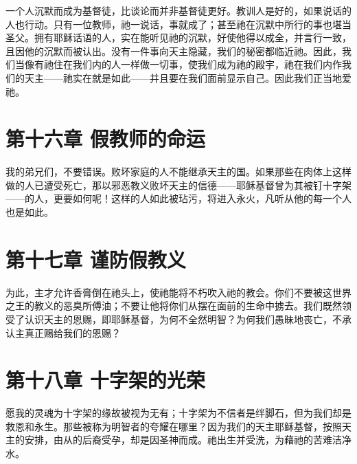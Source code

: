 一个人沉默而成为基督徒，比谈论而并非基督徒更好。教训人是好的，如果说话的人也行动。只有一位教师，祂一说话，事就成了；甚至祂在沉默中所行的事也堪当圣父。拥有耶稣话语的人，实在能听见祂的沉默，好使他得以成全，并言行一致，且因他的沉默而被认出。没有一件事向天主隐藏，我们的秘密都临近祂。因此，我们当像有祂住在我们内的人一样做一切事，使我们成为祂的殿宇，祂在我们内作我们的天主——祂实在就是如此——并且要在我们面前显示自己。因此我们正当地爱祂。\par


\section{第十六章 假教师的命运}

我的弟兄们，不要错误。败坏家庭的人不能继承天主的国。如果那些在肉体上这样做的人已遭受死亡，那以邪恶教义败坏天主的信德——耶稣基督曾为其被钉十字架——的人，更要如何呢！这样的人如此被玷污，将进入永火，凡听从他的每一个人也是如此。\par


\section{第十七章 谨防假教义}

为此，主才允许香膏倒在祂头上，使祂能将不朽吹入祂的教会。你们不要被这世界之王的教义的恶臭所傅油；不要让他将你们从摆在面前的生命中掳去。我们既然领受了认识天主的恩赐，即耶稣基督，为何不全然明智？为何我们愚昧地丧亡，不承认主真正赐给我们的恩赐？\par


\section{第十八章 十字架的光荣}

愿我的灵魂为十字架的缘故被视为无有；十字架为不信者是绊脚石，但为我们却是救恩和永生。那些被称为明智者的夸耀在哪里？因为我们的天主耶稣基督，按照天主的安排，由从的后裔受孕，却是因圣神而成。祂出生并受洗，为藉祂的苦难洁净水。\par


